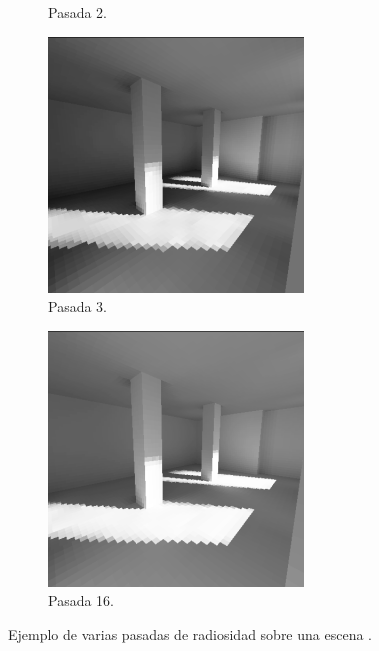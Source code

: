 \begin{figure}[H]
\begin{subfigure}{0.24\textwidth}
		\captionsetup{width=0.95\textwidth, justification=centering}
		\caption*{Pasada 2.}
	\end{subfigure}%
	\begin{subfigure}{0.24\textwidth}
		\centering
		\includegraphics[width=.95\linewidth]{media/radiosity3.png}
		\captionsetup{width=0.95\textwidth, justification=centering}
		\caption*{Pasada 3.}
	\end{subfigure}
	\begin{subfigure}{0.24\textwidth}
		\centering
		\includegraphics[width=.95\linewidth]{media/radiosity16.png}
		\captionsetup{width=0.95\textwidth, justification=centering}
		\caption*{Pasada 16.}
	\end{subfigure}
	\caption{Ejemplo de varias pasadas de radiosidad sobre una escena \cite{hugo2000}.}
	\label{fig:radiosity2}
\end{figure}


